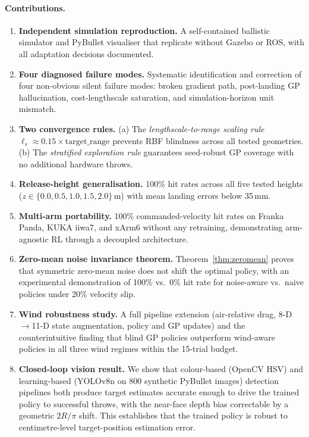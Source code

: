 \paragraph{Contributions.}
\begin{enumerate}
  \item \textbf{Independent simulation reproduction.}
        A self-contained ballistic simulator and PyBullet visualiser that replicate
        \mcpilot{} without Gazebo or ROS, with all adaptation decisions documented.

  \item \textbf{Four diagnosed failure modes.}
        Systematic identification and correction of four non-obvious silent failure modes:
        broken gradient path, post-landing GP hallucination, cost-lengthscale saturation,
        and simulation-horizon unit mismatch.

  \item \textbf{Two convergence rules.}
        (a) The \emph{lengthscale-to-range scaling rule} $\ell_s \approx 0.15 \times
        \text{target\_range}$ prevents RBF blindness across all tested geometries.
        (b) The \emph{stratified exploration rule} guarantees seed-robust GP coverage
        with no additional hardware throws.

  \item \textbf{Release-height generalisation.}
        100\% hit rates across all five tested heights ($z \in \{0.0, 0.5, 1.0, 1.5,
        2.0\}$\,m) with mean landing errors below 35\,mm.

  \item \textbf{Multi-arm portability.}
        100\% commanded-velocity hit rates on Franka Panda, KUKA iiwa7, and xArm6
        without any retraining, demonstrating arm-agnostic RL through a decoupled
        architecture.

  \item \textbf{Zero-mean noise invariance theorem.}
        Theorem~\ref{thm:zeromean} proves that symmetric zero-mean noise does not shift
        the optimal policy, with an experimental demonstration of 100\% vs.\ 0\%
        hit rate for noise-aware vs.\ naive policies under 20\% velocity slip.

  \item \textbf{Wind robustness study.}
        A full pipeline extension (air-relative drag, 8-D$\to$11-D state augmentation,
        policy and GP updates) and the counterintuitive finding that blind GP policies
        outperform wind-aware policies in all three wind regimes within the 15-trial budget.

  \item \textbf{Closed-loop vision result.}
        We show that colour-based (OpenCV HSV) and learning-based (YOLOv8n on 800
        synthetic PyBullet images) detection pipelines both produce target estimates
        accurate enough to drive the trained policy to successful throws, with the
        near-face depth bias correctable by a geometric $2R/\pi$ shift.
        This establishes that the trained policy is robust to centimetre-level
        target-position estimation error.
\end{enumerate}

